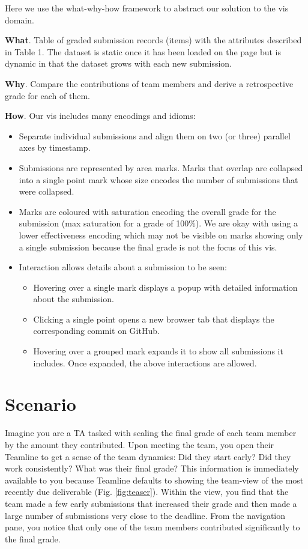 \documentclass[preprint,journal]{vgtc}       %
\begin{document}
Here we use the what-why-how framework \cite{Munzner:2014} to abstract our solution to the vis domain.

\textbf{What}. Table of graded submission records (items) with the attributes
described in Table 1. The dataset is static once it has been loaded on the page
but is dynamic in that the dataset grows with each new submission.

\textbf{Why}. Compare the contributions of team members and derive a retrospective
grade for each of them.

\textbf{How}. Our vis includes many encodings and idioms:
\begin{itemize}
  \item Separate individual submissions and align them on two (or three)
        parallel axes by timestamp.
  \item Submissions are represented by area marks. Marks that overlap are collapsed into
    a single point mark whose size encodes the number of submissions that were collapsed.
  \item Marks are coloured with saturation encoding the overall grade for the submission (max saturation for a grade of 100\%).
    We are okay with using a lower effectiveness encoding which may not be visible on marks showing only a single submission
    because the final grade is not the focus of this vis.
  \item Interaction allows details about a submission to be seen:
    \begin{itemize}
      \item Hovering over a single mark displays a popup with detailed information about the submission.
      \item Clicking a single point opens a new browser tab that displays the corresponding commit on GitHub.
      \item Hovering over a grouped mark expands it to show all submissions it includes. Once expanded,
        the above interactions are allowed.
    \end{itemize}
\end{itemize}

\section{Scenario}
Imagine you are a TA tasked with scaling the final grade of each team member by
the amount they contributed. Upon meeting the team, you open their Teamline to
get a sense of the team dynamics: Did they start early? Did they work consistently?
What was their final grade? This information is immediately available to you
because Teamline defaults to showing the team-view of the most recently due deliverable (Fig. \ref{fig:teaser}).
Within the view, you find that the team made a few early submissions that
increased their grade and then made a large number of submissions very close to
the deadline. From the navigation pane, you notice that only one of the team members
contributed significantly to the final grade.
\end{document}
